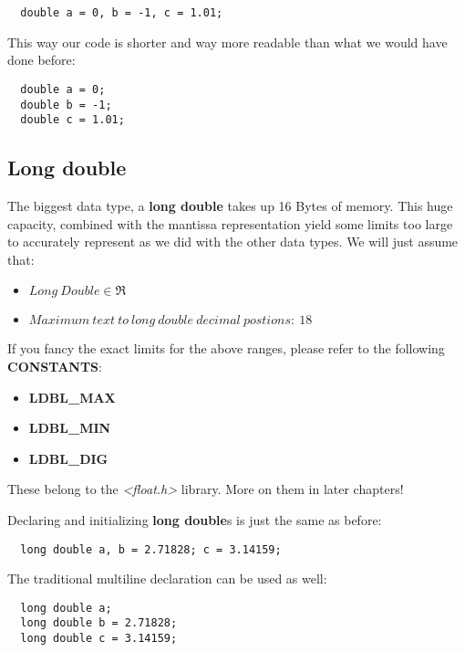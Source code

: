 \documentclass[12pt]{book}
\begin{document}
\begin{verbatim}
  double a = 0, b = -1, c = 1.01;
\end{verbatim}

This way our code is shorter and way more readable than what we would have done before:

\begin{verbatim}
  double a = 0;
  double b = -1;
  double c = 1.01;
\end{verbatim}

\subsection{Long double}

The biggest data type, a \textbf{long double} takes up 16 Bytes of memory. This huge capacity, combined with the mantissa representation yield some limits too large to accurately represent as we did with the other data types. We will just assume that:

\begin{itemize}
  \item $Long\ Double \in \Re$
  \item $Maximum\ text\ to\ long\ double\ decimal\ postions:\ 18$
\end{itemize}

If you fancy the exact limits for the above ranges, please refer to the following \textbf{CONSTANTS}:

\begin{itemize}
  \item \textbf{LDBL\_MAX}
  \item \textbf{LDBL\_MIN}
  \item \textbf{LDBL\_DIG}
\end{itemize}

These belong to the \textit{\textless float.h\textgreater} library. More on them in later chapters!

Declaring and initializing \textbf{long double}s is just the same as before:

\begin{verbatim}
  long double a, b = 2.71828; c = 3.14159;
\end{verbatim}

The traditional multiline declaration can be used as well:

\begin{verbatim}
  long double a;
  long double b = 2.71828;
  long double c = 3.14159;
\end{verbatim}
\end{document}

